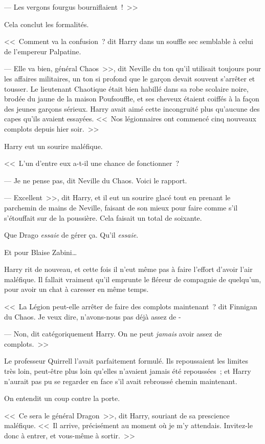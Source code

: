 --- Les vergons fourgus bourniflaient~!~>>

Cela conclut les formalités.

<<~Comment va la confusion~? dit Harry dans un souffle sec semblable à celui de l'empereur Palpatine.

--- Elle va bien, général Chaos~>>, dit Neville du ton qu'il utilisait toujours pour les affaires militaires, un ton si profond que le garçon devait souvent s'arrêter et tousser. Le lieutenant Chaotique était bien habillé dans sa robe scolaire noire, brodée du jaune de la maison Poufsouffle, et ses cheveux étaient coiffés à la façon des jeunes garçons sérieux. Harry avait aimé cette incongruité plus qu'aucune des capes qu'ils avaient essayées. <<~Nos légionnaires ont commencé cinq nouveaux complots depuis hier soir.~>>

Harry eut un sourire maléfique.

<<~L'un d'entre eux a-t-il une chance de fonctionner~?

--- Je ne pense pas, dit Neville du Chaos. Voici le rapport.

--- Excellent~>>, dit Harry, et il eut un sourire glacé tout en prenant le parchemin de mains de Neville, faisant de son mieux pour faire comme s'il s'étouffait sur de la poussière. Cela faisait un total de soixante.

Que Drago \emph{essaie} de gérer ça. Qu'il \emph{essaie}.

Et pour Blaise Zabini…

Harry rit de nouveau, et cette fois il n'eut même pas à faire l'effort d'avoir l'air maléfique. Il fallait vraiment qu'il emprunte le fléreur de compagnie de quelqu'un, pour avoir un chat à caresser en même temps.

<<~La Légion peut-elle arrêter de faire des complots maintenant~? dit Finnigan du Chaos. Je veux dire, n'avons-nous pas déjà assez de -

--- Non, dit catégoriquement Harry. On ne peut \emph{jamais} avoir assez de complots.~>>

Le professeur Quirrell l'avait parfaitement formulé. Ils repoussaient les limites très loin, peut-être plus loin qu'elles n'avaient jamais été repoussées~; et Harry n'aurait pas pu se regarder en face s'il avait rebroussé chemin maintenant.

On entendit un coup contre la porte.

<<~Ce sera le général Dragon~>>, dit Harry, souriant de sa prescience maléfique. <<~Il arrive, précisément au moment où je m'y attendais. Invitez-le donc à entrer, et vous-même à sortir.~>>

